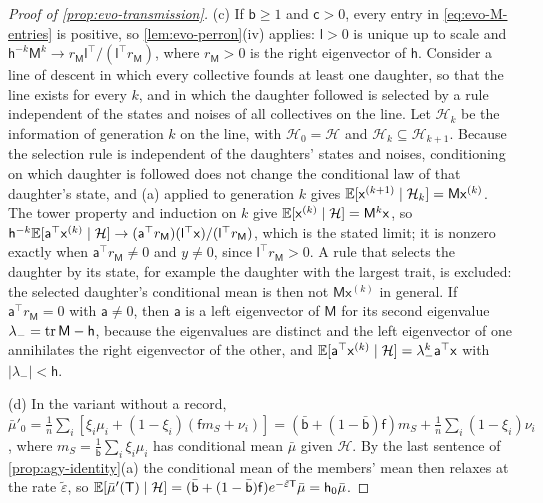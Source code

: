 \begin{proof}[Proof of \cref{prop:evo-transmission}]
(c) If $\mathsf b\ge1$ and $\mathsf c>0$, every entry in \eqref{eq:evo-M-entries} is positive, so \cref{lem:evo-perron}(iv) applies: $\mathsf l>0$ is unique up to scale and $\mathsf h^{-k}\mathsf M^k\to r_{\mathsf M}\mathsf l^\top/(\mathsf l^\top r_{\mathsf M})$, where $r_{\mathsf M}>0$ is the right eigenvector of $\mathsf h$. Consider a line of descent in which every collective founds at least one daughter, so that the line exists for every $k$, and in which the daughter followed is selected by a rule independent of the states and noises of all collectives on the line. Let $\mathcal H_k$ be the information of generation $k$ on the line, with $\mathcal H_0=\mathcal H$ and $\mathcal H_k\subseteq\mathcal H_{k+1}$. Because the selection rule is independent of the daughters' states and noises, conditioning on which daughter is followed does not change the conditional law of that daughter's state, and (a) applied to generation $k$ gives $\mathbb{E}[\mathsf x^{(k+1)}\mid\mathcal H_k]=\mathsf M\mathsf x^{(k)}$. The tower property and induction on $k$ give $\mathbb{E}[\mathsf x^{(k)}\mid\mathcal H]=\mathsf M^k\mathsf x$, so $\mathsf h^{-k}\mathbb{E}[\mathsf a^\top\mathsf x^{(k)}\mid\mathcal H]\to(\mathsf a^\top r_{\mathsf M})(\mathsf l^\top\mathsf x)/(\mathsf l^\top r_{\mathsf M})$, which is the stated limit; it is nonzero exactly when $\mathsf a^\top r_{\mathsf M}\ne0$ and $y\ne0$, since $\mathsf l^\top r_{\mathsf M}>0$. A rule that selects the daughter by its state, for example the daughter with the largest trait, is excluded: the selected daughter's conditional mean is then not $\mathsf M\mathsf x^{(k)}$ in general. If $\mathsf a^\top r_{\mathsf M}=0$ with $\mathsf a\ne0$, then $\mathsf a$ is a left eigenvector of $\mathsf M$ for its second eigenvalue $\lambda_-=\operatorname{tr}\mathsf M-\mathsf h$, because the eigenvalues are distinct and the left eigenvector of one annihilates the right eigenvector of the other, and $\mathbb{E}[\mathsf a^\top\mathsf x^{(k)}\mid\mathcal H]=\lambda_-^k\mathsf a^\top\mathsf x$ with $\lvert\lambda_-\rvert<\mathsf h$.

(d) In the variant without a record, $\bar\mu'_0=\frac1n\sum_i[\xi_i\mu_i+(1-\xi_i)(\mathsf f m_S+\nu_i)]=(\bar{\mathsf b}+(1-\bar{\mathsf b})\mathsf f)m_S+\frac1n\sum_i(1-\xi_i)\nu_i$, where $m_S=\frac1{\mathsf b}\sum_i\xi_i\mu_i$ has conditional mean $\bar\mu$ given $\mathcal H$. By the last sentence of \cref{prop:agy-identity}(a) the conditional mean of the members' mean then relaxes at the rate $\tilde\varepsilon$, so $\mathbb{E}[\bar\mu'(\mathsf T)\mid\mathcal H]=(\bar{\mathsf b}+(1-\bar{\mathsf b})\mathsf f)e^{-\tilde\varepsilon\mathsf T}\bar\mu=\mathsf h_0\bar\mu$.
\end{proof}

